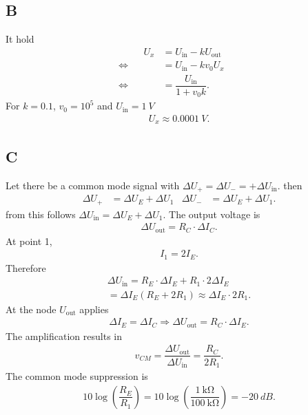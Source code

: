 \documentclass[a4paper,10pt]{article}
\numberwithin{equation}{section}
\begin{document}
\begin{multicols}{2}
	\subsection{B}
	It hold
	\begin{align}
		 &  &                 &  & U_x & = U_\text{in}-kU_\text{out}    &  &  &  &           \\
		 &  & \Leftrightarrow &  &     & = U_\text{in}-kv_0U_x          &  &  &  & \nonumber \\
		 &  & \Leftrightarrow &  &     & = \dfrac{U_\text{in}}{1+v_0k}. &  &  &  &
	\end{align}
	For $k=0.1$, $v_0=10^5$ and $U_\text{in}=\SI{1}{V}$
	\begin{align}
		U_x\approx \SI{0.0001}{V}
		.\end{align}

	\subsection{C}
	Let there be a common mode signal with $\Delta U_+=\Delta U_-=+\Delta U_\text{in}$.
	then
	\begin{align}
		 &  &  &  & \Delta U_+ & = \Delta U_E+\Delta U_1 & \Delta U_- & = \Delta U_E+\Delta U_1. &  &  &  &
	\end{align}
	from this follows $\Delta U_\text{in}=\Delta U_E+\Delta U_1$.
	The output voltage is
	\begin{align}
		\Delta U_\text{out}=R_C\cdot \Delta I_C
		.\end{align}
	At point 1,
	\begin{align}
		I_1=2I_E
		.\end{align}
	Therefore
	\begin{multline}
		\Delta U_\text{in} = R_E\cdot \Delta I_E+R_1 \cdot 2\Delta I_E \\= \Delta I_E\left(R_E+2R_1\right)\approx \Delta I_E\cdot 2R_1.
	\end{multline}
	At the node $U_\text{out}$ applies
	\begin{align}
		\Delta I_E=\Delta I_C\Rightarrow \Delta U_\text{out}=R_C\cdot \Delta I_E
		.\end{align}
	The amplification results in
	\begin{align}
		v_{CM}=\dfrac{\Delta U_\text{out}}{\Delta U_\text{in}}=\dfrac{R_C}{2R_1}
		.\end{align}
	The common mode suppression is
	\begin{align}
		10\log \left(\dfrac{R_E}{R_1}\right)=10\log \left(\dfrac{\SI{1}{\kilo\ohm}}{\SI{100}{\kilo\ohm}}\right)=-\SI{20}{dB}
		.\end{align}


\end{multicols}
\end{document}
